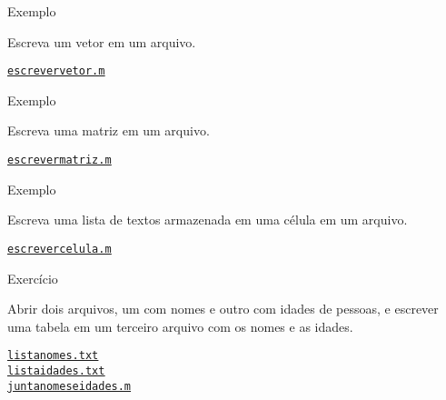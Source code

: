 \documentclass[hyperref={pdfpagelabels=false}]{beamer}
\begin{document}
\begin{frame}{Exemplo}

  Escreva um vetor em um arquivo.

  \vfill
  
  \begin{center}
    \href{listings/escrevervetor.m}{\underline{\texttt{escrevervetor.m}}}
  \end{center}
  
\end{frame}

\begin{frame}{Exemplo}

  Escreva uma matriz em um arquivo.

  \vfill
  
  \begin{center}
    \href{listings/escrevermatriz.m}{\underline{\texttt{escrevermatriz.m}}}
  \end{center}
  
\end{frame}

\begin{frame}{Exemplo}

  Escreva uma lista de textos armazenada em uma célula em um arquivo.

  \vfill
  
  \begin{center}
    \href{listings/escrevercelula.m}{\underline{\texttt{escrevercelula.m}}}
  \end{center}
  
\end{frame}

\begin{frame}{Exercício}

  Abrir dois arquivos, um com nomes e outro com idades de pessoas, e escrever uma tabela em um terceiro arquivo com os nomes e as idades.

  \vfill
  
  \begin{center}
    \href{listings/listanomes.txt}{\underline{\texttt{listanomes.txt}}}\\
    \href{listings/listaidades.txt}{\underline{\texttt{listaidades.txt}}}\\
    \href{listings/juntanomeseidades.m}{\underline{\texttt{juntanomeseidades.m}}}
  \end{center}
  
\end{frame}
\end{document}
